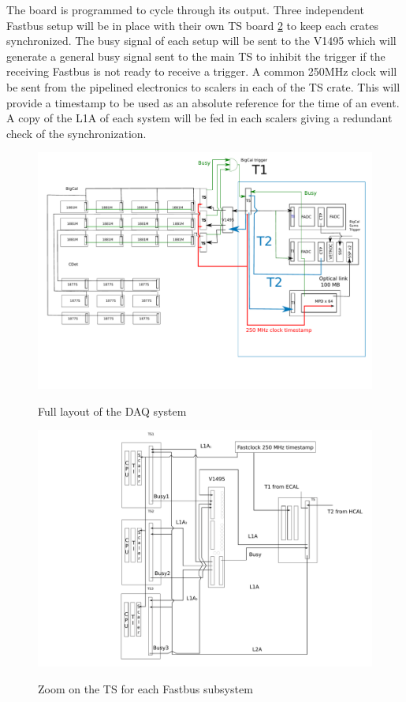 \documentclass{article}
\begin{document}
The board is programmed to cycle through its output. 
Three independent Fastbus setup will be in place with their own TS board \ref{fig:TSs} to keep each crates synchronized.
The busy signal of each setup will be sent to the V1495 which will generate a general busy signal sent to the main TS
to inhibit the trigger if the receiving Fastbus is not ready to receive a trigger. 
A common 250MHz clock will be sent from the pipelined electronics to scalers in each of the TS crate.
This will provide a timestamp to be used as an absolute reference for the time of an event.
A copy of the L1A of each system will be fed in each scalers giving a redundant check of the synchronization.

\begin{figure}
\includegraphics[scale=0.55]{figs/SBSlayoutOld.pdf}\\
  \caption{Full layout of the DAQ system}\label{fig:DAQLayout}

\end{figure}

\begin{figure}
\includegraphics[scale=0.55]{figs/TSs.pdf}\\
  \caption{Zoom on the TS for each Fastbus subsystem}\label{fig:TSs}

\end{figure}
\end{document}
